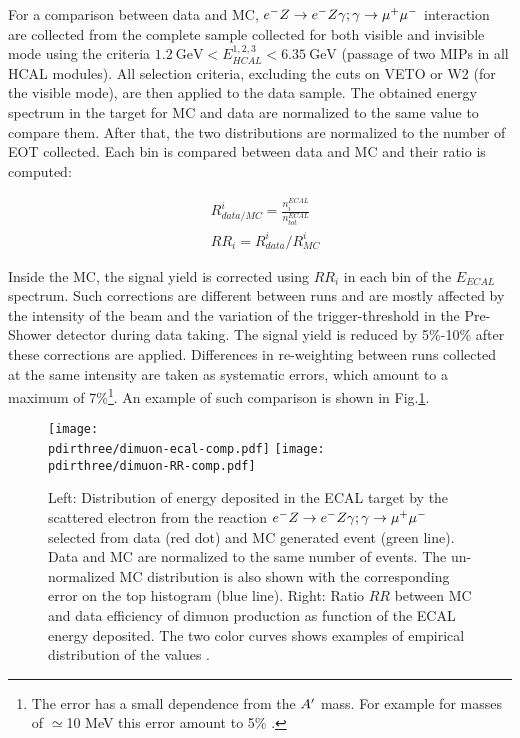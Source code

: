 For a comparison between data and MC, $e^- Z \to e^- Z \gamma; \gamma \to \mu^+ \mu^-$ interaction are collected from the complete sample collected for both visible and invisible mode using the criteria $\SI{1.2}{\giga\electronvolt} < E_{HCAL}^{1,2,3} < \SI{6.35}{\giga\electronvolt}$ (passage of two MIPs in all HCAL modules). All selection criteria, excluding the cuts on VETO or W2 (for the visible mode), are then applied to the data sample. The obtained energy spectrum in the target for MC and data are normalized to the same value to compare them. After that, the two distributions are normalized to the number of EOT collected.
Each bin is compared between data and MC and their ratio is computed:

\begin{equation}  
  \label{eq:RR-factor}
  \begin{aligned}
  &R_{data/MC}^i = \frac{n_i^{ECAL}}{n_{tot}^{ECAL}} \\
  &RR_i = R_{data}^i/R_{MC}^i
  \end{aligned}
\end{equation}

Inside the MC, the signal yield is corrected using $RR_i$ in each bin of the $E_{ECAL}$ spectrum. Such corrections are different between runs and are mostly affected by the intensity of the beam and the variation of the trigger-threshold in the Pre-Shower detector during data taking. The signal yield is reduced by 5\%-10\% after these corrections are applied. Differences in re-weighting between runs collected at the same intensity are taken as systematic errors, which amount to a maximum of 7\%\footnote{The error has a small dependence from the $A'$ mass. For example for masses of $\simeq$10 MeV this error amount to 5\% \cite{na64-prd}.}. An example of such comparison is shown in Fig.\ref{fig:dimuon-comp-invis}.

\begin{figure}[tbh!]
  \centering
  \texttt{[image: \\pdirthree/dimuon-ecal-comp.pdf]}
  \texttt{[image: \\pdirthree/dimuon-RR-comp.pdf]}
  \caption[Dimuon spectra in ECAL for data and MC.]{Left: Distribution of energy deposited in the ECAL target by the scattered electron from the reaction $e^- Z \to e^- Z \gamma; \gamma \to \mu^+ \mu^-$ selected from data (red dot) and MC generated event (green line). Data and MC are normalized to the same number of events. The un-normalized MC distribution is also shown with the corresponding error on the top histogram (blue line). Right: Ratio $RR$ between MC and data efficiency of dimuon production as function of the ECAL energy deposited. The two color curves shows examples of empirical distribution of the values \cite{na64-prd}.}
  \label{fig:dimuon-comp-invis}
\end{figure}

